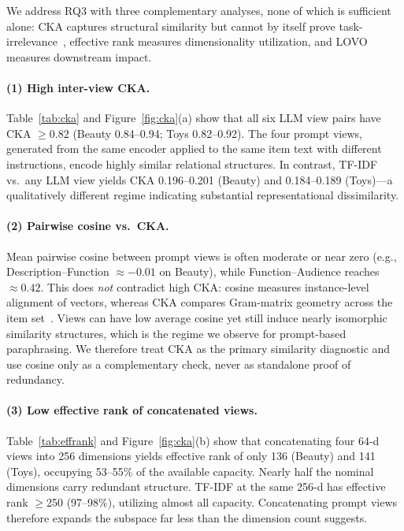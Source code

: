 \documentclass[sigconf,natbib=true,anonymous]{acmart}
\begin{document}
We address RQ3 with three complementary analyses, none of which is sufficient alone: CKA captures structural similarity but cannot by itself prove task-irrelevance~\cite{kornblith2019cka}, effective rank measures dimensionality utilization, and LOVO measures downstream impact.

\paragraph{(1) High inter-view CKA.}
Table~\ref{tab:cka} and Figure~\ref{fig:cka}(a) show that all six LLM view pairs have CKA $\ge 0.82$ (Beauty 0.84--0.94; Toys 0.82--0.92).
The four prompt views, generated from the same encoder applied to the same item text with different instructions, encode highly similar relational structures.
In contrast, TF-IDF vs.\ any LLM view yields CKA 0.196--0.201 (Beauty) and 0.184--0.189 (Toys)---a qualitatively different regime indicating substantial representational dissimilarity.

\paragraph{(2) Pairwise cosine vs.\ CKA.}
Mean pairwise cosine between prompt views is often moderate or near zero (e.g., Description--Function $\approx -0.01$ on Beauty), while Function--Audience reaches $\approx 0.42$.
This does \emph{not} contradict high CKA: cosine measures instance-level alignment of vectors, whereas CKA compares Gram-matrix geometry across the item set~\cite{kornblith2019cka}.
Views can have low average cosine yet still induce nearly isomorphic similarity structures, which is the regime we observe for prompt-based paraphrasing.
We therefore treat CKA as the primary similarity diagnostic and use cosine only as a complementary check, never as standalone proof of redundancy.

\paragraph{(3) Low effective rank of concatenated views.}
Table~\ref{tab:effrank} and Figure~\ref{fig:cka}(b) show that concatenating four 64-d views into 256 dimensions yields effective rank of only 136 (Beauty) and 141 (Toys), occupying 53--55\% of the available capacity.
Nearly half the nominal dimensions carry redundant structure.
TF-IDF at the same 256-d has effective rank $\ge$250 (97--98\%), utilizing almost all capacity.
Concatenating prompt views therefore expands the subspace far less than the dimension count suggests.
\end{document}
